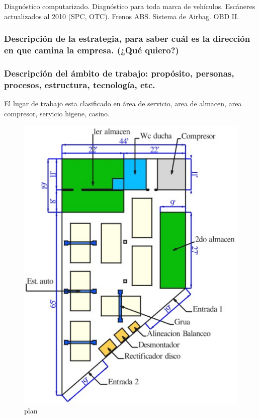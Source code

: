 \documentclass[
]{article}
\begin{document}
Diagnóstico computarizado. Diagnóstico para toda marca de vehículos.
Escáneres actualizados al 2010 (SPC, OTC). Frenos ABS. Sistema de
Airbag. OBD II.

\hypertarget{descripciuxf3n-de-la-estrategia-para-saber-cuuxe1l-es-la-direcciuxf3n-en-que-camina-la-empresa.-quuxe9-quiero}{%
\subsubsection{Descripción de la estrategia, para saber cuál es la
dirección en que camina la empresa. (¿Qué
quiero?)}\label{descripciuxf3n-de-la-estrategia-para-saber-cuuxe1l-es-la-direcciuxf3n-en-que-camina-la-empresa.-quuxe9-quiero}}

\hypertarget{descripciuxf3n-del-uxe1mbito-de-trabajo-propuxf3sito-personas-procesos-estructura-tecnologuxeda-etc.}{%
\subsubsection{Descripción del ámbito de trabajo: propósito, personas,
procesos, estructura, tecnología,
etc.}\label{descripciuxf3n-del-uxe1mbito-de-trabajo-propuxf3sito-personas-procesos-estructura-tecnologuxeda-etc.}}

El lugar de trabajo esta clasificado en área de servicio, area de
almacen, area compresor, servicio higene, casino.

\begin{figure}
\centering
\includegraphics{fig/plan.png}
\caption{plan}
\end{figure}
\end{document}
